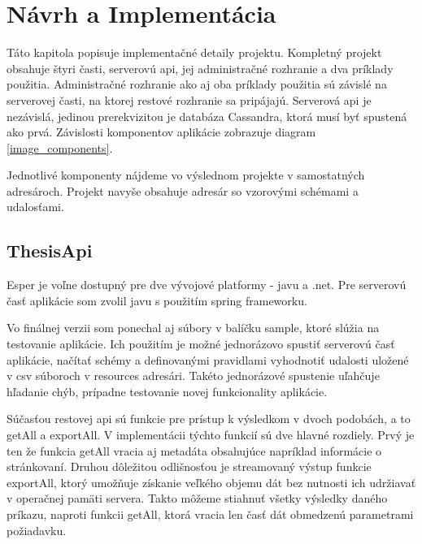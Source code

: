 \chapter{Návrh a Implementácia}
\label{chap:implementacia}

Táto kapitola popisuje implementačné detaily projektu. Kompletný projekt obsahuje štyri časti, serverovú api, jej administračné rozhranie a dva príklady použitia. Administračné rozhranie ako aj oba príklady použitia sú závislé na serverovej časti, na ktorej restové rozhranie sa pripájajú. Serverová api je nezávislá, jedinou prerekvizitou je databáza Cassandra, ktorá musí byť spustená ako prvá. Závislosti komponentov aplikácie zobrazuje diagram \ref{image_components}.

Jednotlivé komponenty nájdeme vo výslednom projekte v samostatných adresároch. Projekt navyše obsahuje adresár so vzorovými schémami a udalosťami.

\section{ThesisApi}
	Esper je voľne dostupný pre dve vývojové platformy - javu a .net. Pre serverovú časť aplikácie som zvolil javu s použitím spring frameworku.

	Vo finálnej verzii som ponechal aj súbory v balíčku sample, ktoré slúžia na testovanie aplikácie. Ich použitím je možné jednorázovo spustiť serverovú časť aplikácie, načítať schémy a definovanými pravidlami vyhodnotiť udalosti uložené v csv súboroch v resources adresári. Takéto jednorázové spustenie uľahčuje hľadanie chýb, prípadne testovanie novej funkcionality aplikácie.

	Súčasťou restovej api sú funkcie pre prístup k výsledkom v dvoch podobách, a to getAll a exportAll. V implementácii týchto funkcií sú dve hlavné rozdiely. Prvý je ten že funkcia getAll vracia aj metadáta obsahujúce napríklad informácie o stránkovaní. Druhou dôležitou odlišnosťou je streamovaný výstup funkcie exportAll, ktorý umožňuje získanie veľkého objemu dát bez nutnosti ich udržiavať v operačnej pamäti servera. Takto môžeme stiahnuť všetky výsledky daného príkazu, naproti funkcii getAll, ktorá vracia len časť dát obmedzenú parametrami požiadavku.
	
